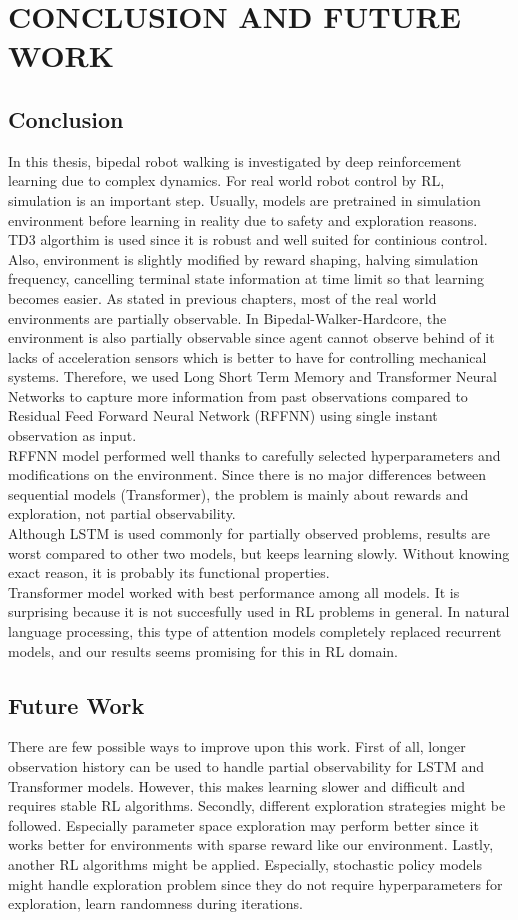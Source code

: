 \chapter{CONCLUSION AND FUTURE WORK}
\label{chap:conclusion}
\section{Conclusion}
In this thesis, bipedal robot walking is investigated by deep  reinforcement learning due to complex dynamics. For real world robot control by RL, simulation is an important step. Usually, models are pretrained in simulation environment before learning in reality due to safety and exploration reasons. \\
TD3 algorthim is used since it is robust and well suited for continious control. Also, environment is slightly modified by reward shaping, halving simulation frequency, cancelling terminal state information at time limit so that learning becomes easier.  
As stated in previous chapters, most of the real world environments are partially observable. In Bipedal-Walker-Hardcore, the environment is also partially observable since agent cannot observe behind of it lacks of acceleration sensors which is better to have for controlling mechanical systems. Therefore, we used Long Short Term Memory and Transformer Neural Networks to capture more information from past observations compared to Residual Feed Forward Neural Network (RFFNN) using single instant observation as input. \\
RFFNN model performed well thanks to carefully selected hyperparameters and modifications on the environment. Since there is no major differences between sequential models (Transformer), the problem is mainly about rewards and exploration, not partial observability. \\
Although LSTM is used commonly for partially observed problems, results are worst compared to other two models, but keeps learning slowly. Without knowing exact reason, it is probably its functional properties. \\
Transformer model worked with best performance among all models. It is surprising because it is not succesfully used in RL problems in general. In natural language processing, this type of attention models completely replaced recurrent models, and our results seems promising for this in RL domain. \\
\section{Future Work}
There are few possible ways to improve upon this work. First of all, longer observation history can be used to handle partial observability for LSTM and Transformer models. However, this makes learning slower and difficult and requires stable RL algorithms. Secondly, different exploration strategies might be followed. Especially parameter space exploration \cite{plappert_parameter_2018} may perform better since it works better for environments with sparse reward like our environment. 
Lastly, another RL algorithms might be applied. Especially, stochastic policy models might handle exploration problem since they do not require hyperparameters for exploration, learn randomness during iterations.